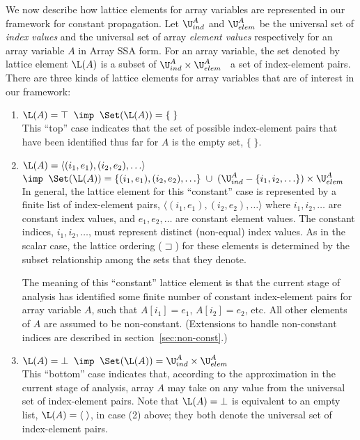 We now describe how lattice elements for array variables are represented in 
our framework for constant propagation.
Let $\U^A_{ind}$ and $\U^A_{elem}$ be the universal set of {\it index values}
and the universal set of array {\it element values} respectively
for an array variable $A$
in Array SSA form.
For an array variable,
the set denoted by
lattice element $\L(A)$ is a subset of $\U^A_{ind} \times \U^A_{elem}$ \ie\
a set of index-element pairs.
There are three kinds of lattice elements for array variables that are of
interest in our framework:
\begin{enumerate}
\item $\L(A) = \top \;\;\imp\;\; \Set(\L(A)) = \{\;\}$\\
This ``top'' case indicates that the set of possible index-element
pairs
that have been identified thus far for $A$ is the empty set, $\{\;\}$.


\item $\L(A) = \langle(i_1,e_1), (i_2,e_2), \ldots\rangle$\\
$\imp\;\; \Set(\L(A)) = \{ (i_1,e_1), (i_2,e_2), \ldots \} \;\cup\;
(\U^A_{ind}-\{i_1,i_2,\ldots\})\times \U^A_{elem}$\\
In general,
the lattice element for this ``constant'' case is represented by a finite
list
of index-element pairs, $\langle(i_1,e_1), (i_2,e_2), \ldots\rangle$
where $i_1, i_2, \ldots$ are constant index values, and 
$e_1, e_2, \ldots$ are constant element values.
The constant indices, $i_1, i_2, \ldots$, must represent distinct (non-equal)
index values.  As in the scalar case,
the lattice ordering ($\sqsupset$) for these  elements is determined by the subset
relationship among the sets that they denote.


The meaning of this ``constant'' lattice element is
that the current stage of analysis
has identified some finite number of constant index-element pairs
for array variable $A$, such
that $A[i_1] = e_1$, $A[i_2] = e_2$, etc.
All other elements of $A$ are assumed to be non-constant.
(Extensions to handle non-constant indices are
described in section~\ref{sec:non-const}.)

\item $\L(A) = \bot \;\;\imp\;\; \Set(\L(A)) =  \U^A_{ind} \times \U^A_{elem}$\\
This ``bottom''
case indicates that, according to
the approximation in the current stage of analysis, array $A$ may take on any
value from the universal set of index-element pairs.
Note that $\L(A)=\bot$ is equivalent to an empty list,
$\L(A)=\langle \; \rangle$, in case (2) above; they both 
denote the universal set of index-element pairs.
\end{enumerate}

